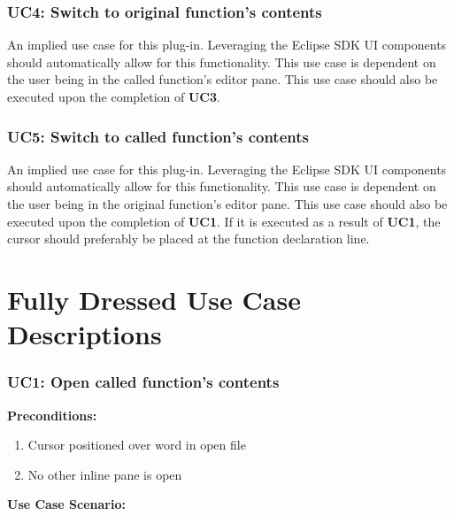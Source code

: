\documentclass[]{report}
\begin{document}
		\subsubsection{UC4:  Switch to original function's contents}
		
			An implied use case for this plug-in.  Leveraging the Eclipse SDK UI components should automatically allow for this functionality.  This use case is dependent on the user being in the called function's editor pane.   This use case should also be executed upon the completion of \textbf{UC3}.
			
		\subsubsection{UC5:  Switch to called function's contents}
		
			An implied use case for this plug-in.  Leveraging the Eclipse SDK UI components should automatically allow for this functionality.  This use case is dependent on the user being in the original function's editor pane.  This use case should also be executed upon the completion of \textbf{UC1}.  If it is executed as a result of \textbf{UC1}, the cursor should preferably be placed at the function declaration line.
	
	\section{Fully Dressed Use Case Descriptions}
	
		\subsubsection{UC1: Open called function's contents}
		
			\textbf{Preconditions:}
			
				\begin{enumerate}
					
					\item Cursor positioned over word in open file
					
					\item No other inline pane is open
					
				\end{enumerate}
		
			\noindent\textbf{Use Case Scenario:}
			
\end{document}
